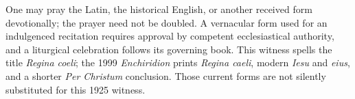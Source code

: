One may pray the Latin, the historical English, or another received form devotionally; the prayer need not be doubled. A vernacular form used for an indulgenced recitation requires approval by competent ecclesiastical authority, and a liturgical celebration follows its governing book. This witness spells the title \textit{Regina coeli}; the 1999 \textit{Enchiridion} prints \textit{Regina caeli}, modern \textit{Iesu} and \textit{eius}, and a shorter \textit{Per Christum} conclusion. Those current forms are not silently substituted for this 1925 witness.
